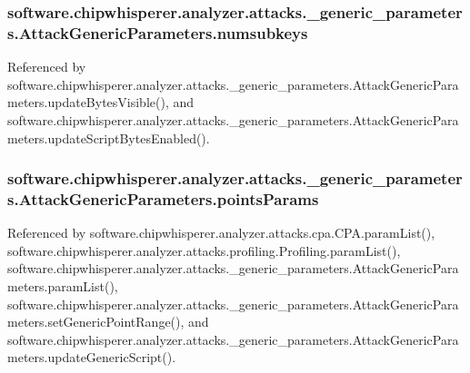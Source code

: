 \subsubsection[{numsubkeys}]{\setlength{\rightskip}{0pt plus 5cm}software.\+chipwhisperer.\+analyzer.\+attacks.\+\_\+generic\+\_\+parameters.\+Attack\+Generic\+Parameters.\+numsubkeys}\label{classsoftware_1_1chipwhisperer_1_1analyzer_1_1attacks_1_1__generic__parameters_1_1AttackGenericParameters_aed19c974ec412f46ba6f21a2d7c60852}


Referenced by software.\+chipwhisperer.\+analyzer.\+attacks.\+\_\+generic\+\_\+parameters.\+Attack\+Generic\+Parameters.\+update\+Bytes\+Visible(), and software.\+chipwhisperer.\+analyzer.\+attacks.\+\_\+generic\+\_\+parameters.\+Attack\+Generic\+Parameters.\+update\+Script\+Bytes\+Enabled().

\hypertarget{classsoftware_1_1chipwhisperer_1_1analyzer_1_1attacks_1_1__generic__parameters_1_1AttackGenericParameters_a193c6d6be7e13f462d53a95029caa2d1}{}
\subsubsection[{points\+Params}]{\setlength{\rightskip}{0pt plus 5cm}software.\+chipwhisperer.\+analyzer.\+attacks.\+\_\+generic\+\_\+parameters.\+Attack\+Generic\+Parameters.\+points\+Params}\label{classsoftware_1_1chipwhisperer_1_1analyzer_1_1attacks_1_1__generic__parameters_1_1AttackGenericParameters_a193c6d6be7e13f462d53a95029caa2d1}


Referenced by software.\+chipwhisperer.\+analyzer.\+attacks.\+cpa.\+C\+P\+A.\+param\+List(), software.\+chipwhisperer.\+analyzer.\+attacks.\+profiling.\+Profiling.\+param\+List(), software.\+chipwhisperer.\+analyzer.\+attacks.\+\_\+generic\+\_\+parameters.\+Attack\+Generic\+Parameters.\+param\+List(), software.\+chipwhisperer.\+analyzer.\+attacks.\+\_\+generic\+\_\+parameters.\+Attack\+Generic\+Parameters.\+set\+Generic\+Point\+Range(), and software.\+chipwhisperer.\+analyzer.\+attacks.\+\_\+generic\+\_\+parameters.\+Attack\+Generic\+Parameters.\+update\+Generic\+Script().

